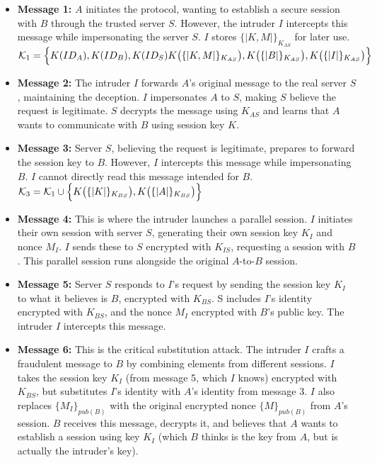 \documentclass[11pt]{article}
\begin{document}
    \begin{itemize}
        \item \textbf{Message 1:} $A$ initiates the protocol, wanting to establish a secure session with $B$ through
        the trusted server $S$. However, the intruder $I$ intercepts this message while
        impersonating the server $S$. $I$ stores $\{| K, M |\}_{K_{AS}}$ for later use.
        $\mathcal{K}_1 = \Bigl\{ K(ID_A), K(ID_B), K(ID_S) \\ K\bigl(\{| K, M |\}_{K_{AS}}\bigr), K\bigl(\{|B|\}_{K_{AS}}\bigr), K\bigl(\{|I|\}_{K_{AS}}\bigr) \Bigr\}$

        \item \textbf{Message 2:} The intruder $I$ forwards $A$'s original message to the real server $S$, maintaining
        the deception. $I$ impersonates $A$ to $S$, making $S$ believe the request is legitimate. $S$ decrypts
        the message using $K_{AS}$ and learns that $A$ wants to communicate with $B$ using session key $K$.


        \item \textbf{Message 3:} Server $S$, believing the request is legitimate, prepares to forward the session key
        to $B$. However, $I$ intercepts this message while impersonating $B$. $I$ cannot directly read this
        message intended for $B$.
        $\mathcal{K}_3 = \mathcal{K}_1 \cup \Bigl\{ K\bigl( \{| K |\}_{K_{BS}}\bigr),  K\bigl(\{|A|\}_{K_{BS}}\bigr) \Bigr\}$




        \item \textbf{Message 4:} This is where the intruder launches a parallel session. $I$ initiates their own
        session with server $S$, generating their own session key $K_I$ and nonce $M_I$. $I$ sends these to $S$
        encrypted with $K_{IS}$, requesting a session with $B$. This parallel session runs alongside the original
        $A$-to-$B$ session.

        \item \textbf{Message 5:} Server $S$ responds to $I$'s request by sending the session key $K_I$ to what it
        believes is $B$, encrypted with $K_{BS}$. S includes $I$'s identity encrypted with $K_{BS}$, and the
        nonce $M_I$ encrypted with $B$'s public key. The intruder $I$ intercepts this message.

        \item \textbf{Message 6:} This is the critical substitution attack. The intruder $I$ crafts a fraudulent message
        to $B$ by combining elements from different sessions. $I$ takes the session key $K_I$ (from message 5,
        which $I$ knows) encrypted with $K_{BS}$, but substitutes $I$'s identity with $A$'s identity from message 3.
        $I$ also replaces $\{M_I\}_{pub(B)}$ with the original encrypted nonce $\{M\}_{pub(B)}$ from $A$'s session.
        $B$ receives this message, decrypts it, and believes that $A$ wants to establish a session using key
        $K_I$ (which $B$ thinks is the key from $A$, but is actually the intruder's key).


\end{itemize}
\end{document}
